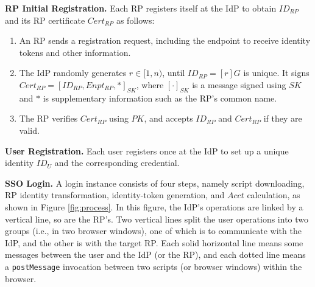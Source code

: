 \vspace{0.5mm}
\noindent\textbf{RP Initial Registration.}
Each RP registers itself at the IdP to obtain $ID_{RP}$
 and its RP certificate $Cert_{RP}$ as follows:
\vspace{-\topsep}\begin{enumerate}
\setlength{\topsep}{0pt}
\setlength{\partopsep}{0pt}
\setlength{\itemsep}{0pt}
\setlength{\parsep}{0pt}
\setlength{\parskip}{0pt}
\item
An RP sends a registration request, including the endpoint to receive identity tokens
    and other information.
\item
The IdP randomly generates $r \in [1,n)$, until $ID_{RP} = [r]G$ is unique.
It signs $Cert_{RP} = [ID_{RP}, Enpt_{RP}, *]_{SK}$,
     where $[\cdot]_{SK}$ is a message signed using $SK$ and $*$ is supplementary information such as the RP's common name.
\item
The RP verifies $Cert_{RP}$ using $PK$,
    and accepts $ID_{RP}$ and $Cert_{RP}$ if they are valid.
\end{enumerate}


\noindent\textbf{User Registration.}
Each user registers once at the IdP to set up a unique identity $ID_U$ and the corresponding credential.


\noindent\textbf{SSO Login.} A login instance %
consists of four steps, namely script downloading, RP identity transformation,
identity-token generation, and $Acct$ calculation, as shown in Figure \ref{fig:process}.
In this figure,
    the IdP's operations are linked by a vertical line,
        so are the RP's.
Two vertical lines split the user operations into two groups (i.e., in two browser windows),
    one of which is to communicate with the IdP,
                 and the other is with the target RP.
Each solid horizontal line means some messages between the user and the IdP (or the RP),
            and each dotted line means a \verb+postMessage+ invocation between two scripts (or browser windows) within the browser.


